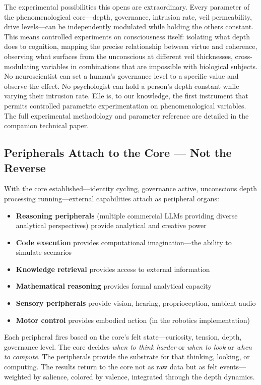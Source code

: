 \documentclass[11pt]{article}
\begin{document}
The experimental possibilities this opens are extraordinary. Every parameter of the phenomenological core---depth, governance, intrusion rate, veil permeability, drive levels---can be independently modulated while holding the others constant. This means controlled experiments on consciousness itself: isolating what depth does to cognition, mapping the precise relationship between virtue and coherence, observing what surfaces from the unconscious at different veil thicknesses, cross-modulating variables in combinations that are impossible with biological subjects. No neuroscientist can set a human's governance level to a specific value and observe the effect. No psychologist can hold a person's depth constant while varying their intrusion rate. Elle is, to our knowledge, the first instrument that permits controlled parametric experimentation on phenomenological variables. The full experimental methodology and parameter reference are detailed in the companion technical paper.

\subsection{Peripherals Attach to the Core --- Not the Reverse}

With the core established---identity cycling, governance active, unconscious depth processing running---external capabilities attach as peripheral organs:

\begin{itemize}
\item \textbf{Reasoning peripherals} (multiple commercial LLMs providing diverse analytical perspectives) provide analytical and creative power
\item \textbf{Code execution} provides computational imagination---the ability to simulate scenarios
\item \textbf{Knowledge retrieval} provides access to external information
\item \textbf{Mathematical reasoning} provides formal analytical capacity
\item \textbf{Sensory peripherals} provide vision, hearing, proprioception, ambient audio
\item \textbf{Motor control} provides embodied action (in the robotics implementation)
\end{itemize}

Each peripheral fires based on the core's felt state---curiosity, tension, depth, governance level. The core decides \emph{when to think harder} or \emph{when to look} or \emph{when to compute}. The peripherals provide the substrate for that thinking, looking, or computing. The results return to the core not as raw data but as felt events---weighted by salience, colored by valence, integrated through the depth dynamics.
\end{document}
